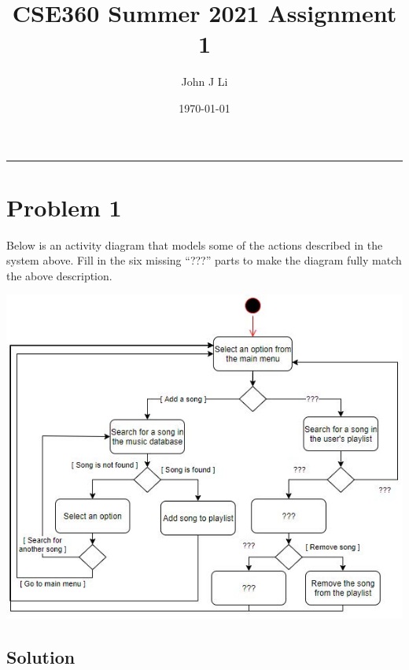 \documentclass{article}
\title{CSE360 Summer 2021 Assignment 1}
\date{\today}
\author{John J Li}
\begin{document}
    \maketitle
    \thispagestyle{empty}
    \noindent\rule{\textwidth}{0.8pt}



    \section*{Problem 1}

    Below is an activity diagram that models some of the actions described in the system
    above. Fill in the six missing “???” parts to make the diagram fully match the above
    description.

    \begin{center}
        \includegraphics[scale=0.75]{Exercise 01_ Practice Problems.jpg}
    \end{center}

    \subsection*{Solution}
\end{document}
